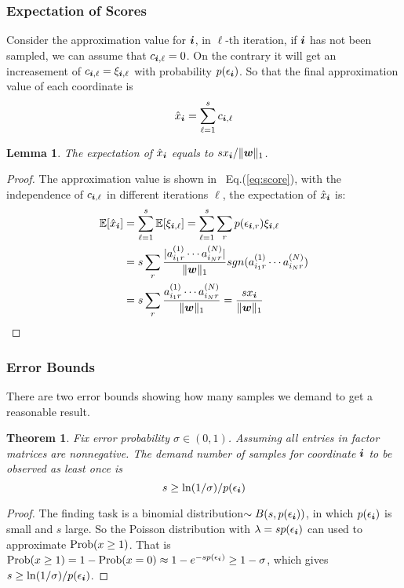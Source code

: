 \documentclass[letterpaper]{article}
\newcommand{\Sca}[3]{{#1}^{(#2)}_{i_#2#3}}%
\newcommand{\anr}[2]{\Sca{a}{#1}{#2}}
\newcommand{\score}[1]{\xi_{\V{i},#1}}
\newcommand{\V}[1]{{\boldsymbol{{\MakeLowercase{#1}}}}}
\newcommand{\predx}{\hat{x}_{\V{i}}}
\newcommand{\norm}[2]{\|#1\|_{#2}}
\newcommand{\Eqn}[1]{Eq.(\ref{eq:#1})}
\newtheorem{lemma}{Lemma}
\newtheorem{theorem}{Theorem}
\begin{document}
\subsubsection{Expectation of Scores}
Consider the approximation value for $\V{i}$, in $\ell$-th iteration,
if $\V{i}$ has not been sampled,
we can assume that $c_{\V{i},\ell}=0$.
On the contrary it will get an increasement of $c_{\V{i},\ell}=\score{\ell}$ with probability $p(\epsilon_{\V{i}})$.
So that the final approximation value of each coordinate is
\begin{equation}\label{eq:score}
\predx = \sum_{\ell=1}^{s} c_{\V{i},\ell}
\end{equation}

\begin{lemma}\label{lem:Expectation}
The expectation of $\predx$ equals to $sx_{\V{i}}/\norm{\V{w}}{1}$.
\end{lemma}
\begin{proof}
    The approximation value is shown in ~\Eqn{score},
    with the independence of $c_{\V{i},\ell}$ in different iterations $\ell$,
    the expectation of $\hat{x}_{\V{i}}$ is:
\begin{align*}
\mathbb{E}[\predx]
& = \sum_{\ell=1}^{s}\mathbb{E}[\score{\ell}] = \sum_{\ell=1}^{s}\sum_{r} p(\epsilon_{\V{i},r})\score{\ell} \\
& = s\sum_{r} \frac{|\anr{1}{r}\cdots\anr{N}{r}|}{\norm{\V{W}}{1}}
                  sgn(\anr{1}{r}\cdots\anr{N}{r})\\
& = s\sum_{r} \frac{\anr{1}{r}\cdots\anr{N}{r}}{\norm{\V{W}}{1}}
  = \frac{sx_{\V{i}}}{\norm{\V{w}}{1}}
\end{align*}
\end{proof}

\subsubsection{Error Bounds}
There are two error bounds showing how many samples we demand to get a reasonable result. 
\begin{theorem}\label{theo:ObservationBound}
Fix error probability $\sigma \in (0,1)$.
Assuming all entries in factor matrices are nonnegative.
The demand number of samples for coordinate $\V{i}$ to be observed as least once is
\[
    s \geq \ln(1/\sigma)/p(\epsilon_{\V{i}})
\]
\end{theorem}
\begin{proof}
The finding task is a binomial distribution$\sim B(s,p(\epsilon_{\V{i}}))$,
in which $p(\epsilon_{\V{i}})$ is small and $s$ large.
So the Poisson distribution with $\lambda = sp(\epsilon_{\V{i}})$
can used to approximate ${\rm Prob}(x\geq1)$.
That is ${\rm Prob}(x\geq1) = 1-{\rm Prob}(x=0)\approx 1-e^{-sp(\epsilon_{\V{i}})} \geq 1-\sigma$,
which gives $s \geq \ln(1/\sigma)/p(\epsilon_{\V{i}})$.
\end{proof}
\end{document}
